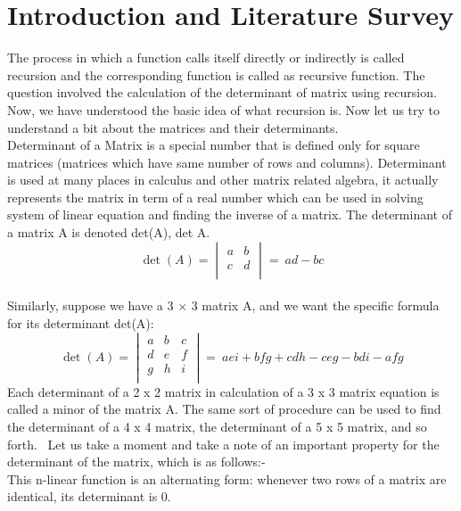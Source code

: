 \documentclass[conference]{IEEEtran}
\begin{document}
\section{Introduction and Literature Survey}
The process in which a function calls itself directly or indirectly is called recursion and the corresponding function is called as recursive function. The question involved the calculation of the determinant of matrix using recursion.
Now, we have understood the basic idea of what recursion is. Now let us try to understand a bit about the matrices and their determinants.
\\Determinant of a Matrix is a special number that is defined only for square matrices (matrices which have same number of rows and columns). Determinant is used at many places in calculus and other matrix related algebra, it actually represents the matrix in term of a real number which can be used in solving system of linear equation and finding the inverse of a matrix. The determinant of a matrix A is denoted det(A), det A.
\[
\det(A) =
\begin{vmatrix}
a & b\\ 
c & d\\
\end{vmatrix}
=
\ ad-bc
\]
\\Similarly, suppose we have a 3 × 3 matrix A, and we want the specific formula for its determinant det(A):
\[
\det(A) =
\begin{vmatrix}
a & b & c\\ 
d & e & f\\
g & h & i\\
\end{vmatrix}
=
\ aei + bfg + cdh - ceg - bdi - afg 
\]
Each determinant of a 2 x 2 matrix in calculation of a 3 x 3 matrix equation is called a minor of the matrix A. The same sort of procedure can be used to find the determinant of a 4 x 4 matrix, the determinant of a 5 x 5 matrix, and so forth.
\ Let us take a moment and take a note of an important property for the determinant of the matrix, which is as follows:-
\\ This n-linear function is an alternating form: whenever two rows of a matrix are identical, its determinant is 0.
\end{document}
